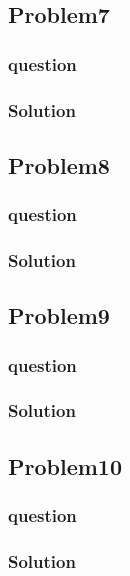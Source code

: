 \documentclass[journal,12pt,twocolumn]{IEEEtran}
\begin{document}
\subsection{Problem7}
\subsubsection{question}

\subsubsection{Solution}


\subsection{Problem8}
\subsubsection{question}

\subsubsection{Solution}


\subsection{Problem9}
\subsubsection{question}

\subsubsection{Solution}


\subsection{Problem10}
\subsubsection{question}

\subsubsection{Solution}

\end{document}
